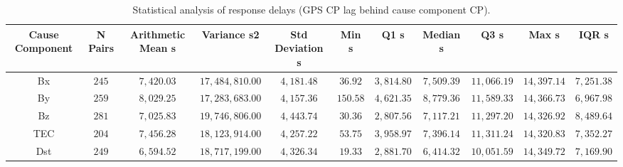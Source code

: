 \vspace{-3pt}
\begin{table}[H]
\caption{Statistical analysis of response delays (GPS CP lag behind cause component CP).\label{tab:Response_Delay_Summary_Statistics_300}}
\begin{tabularx}{\textwidth}{CCCCCCCCCCC}
\toprule
\textbf{Cause Component} & \textbf{N Pairs} & \textbf{Arithmetic Mean s} & \textbf{Variance s2} & \textbf{Std Deviation s} & \textbf{Min s} & \textbf{Q1 s} & \textbf{Median s} & \textbf{Q3 s} & \textbf{Max s} & \textbf{IQR s} \\
\midrule
Bx & $245$ & $7,420.03$ & $17,484,810.00$ & $4,181.48$ & $36.92$ & $3,814.80$ & $7,509.39$ & $11,066.19$ & $14,397.14$ & $7,251.38$ \\
By & $259$ & $8,029.25$ & $17,283,683.00$ & $4,157.36$ & $150.58$ & $4,621.35$ & $8,779.36$ & $11,589.33$ & $14,366.73$ & $6,967.98$ \\
Bz & $281$ & $7,025.83$ & $19,746,806.00$ & $4,443.74$ & $30.36$ & $2,807.56$ & $7,117.21$ & $11,297.20$ & $14,326.92$ & $8,489.64$ \\
TEC & $204$ & $7,456.28$ & $18,123,914.00$ & $4,257.22$ & $53.75$ & $3,958.97$ & $7,396.14$ & $11,311.24$ & $14,320.83$ & $7,352.27$ \\
Dst & $249$ & $6,594.52$ & $18,717,199.00$ & $4,326.34$ & $19.33$ & $2,881.70$ & $6,414.32$ & $10,051.59$ & $14,349.72$ & $7,169.90$ \\
\bottomrule
\end{tabularx}
\end{table}
\vspace{-3pt}
